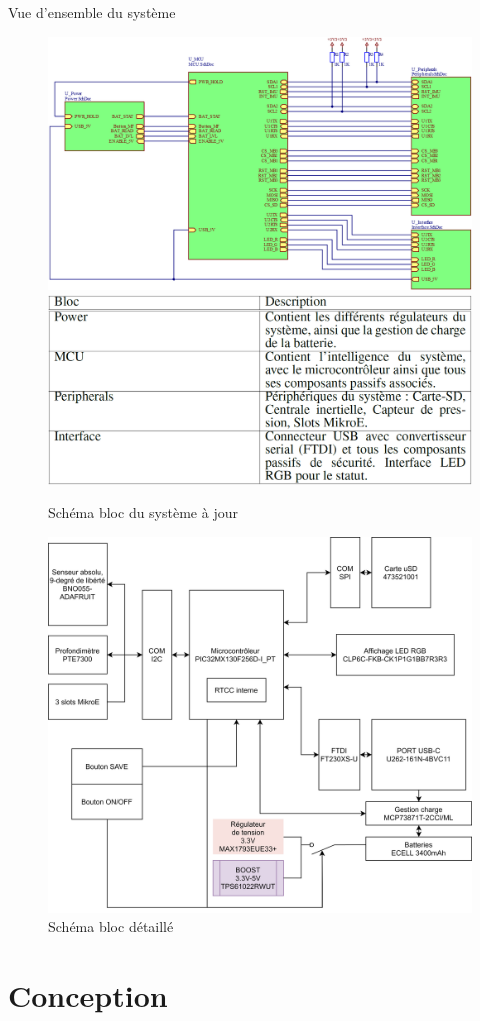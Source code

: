 \documentclass[compress,aspectratio=169]{beamer}
\begin{document}
\begin{frame}{Vue d'ensemble du système}
	\begin{figure}
		\par
		\noindent
		\includegraphics[width=0.55\linewidth]{Images/Dev-SCH/schemaBloc}%
		\hfill
		\includegraphics[width=0.45\linewidth]{Images/Dev-SCH/DescrBlocs}%
		\par
		\caption{Schéma bloc du système à jour}
	\end{figure}
\end{frame}

\begin{frame}
	\begin{figure}
		\centering
		\includegraphics[width=0.6\linewidth]{Images/Dev-SCH/Schema-bloc-detail}
		\caption{Schéma bloc détaillé}
		\label{fig:schema-bloc-detail}
	\end{figure}
\end{frame}

\section{Conception}
\end{document}

